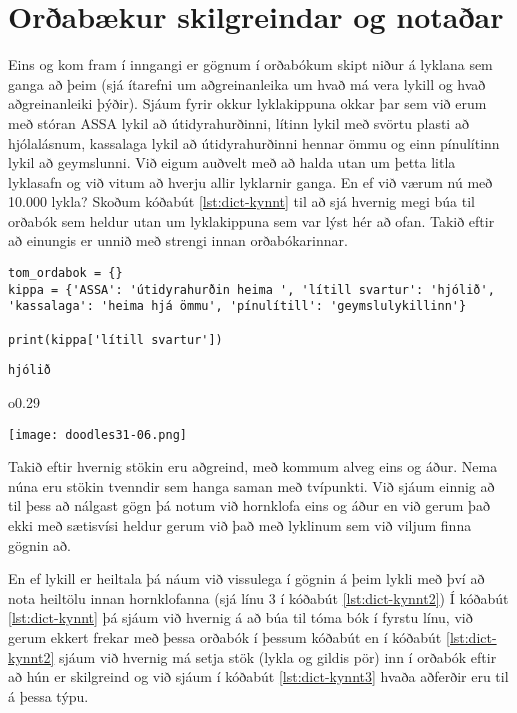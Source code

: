 \section{Orðabækur skilgreindar og notaðar}
Eins og kom fram í inngangi er gögnum í orðabókum skipt niður á lyklana sem ganga að þeim (sjá ítarefni um aðgreinanleika um hvað má vera lykill og hvað aðgreinanleiki þýðir).
Sjáum fyrir okkur lyklakippuna okkar þar sem við erum með stóran ASSA lykil að útidyrahurðinni, lítinn lykil með svörtu plasti að hjólalásnum, kassalaga lykil að útidyrahurðinni hennar ömmu og einn pínulítinn lykil að geymslunni.
Við eigum auðvelt með að halda utan um þetta litla lyklasafn og við vitum að hverju allir lyklarnir ganga.
En ef við værum nú með 10.000 lykla?
Skoðum kóðabút \ref{lst:dict-kynnt} til að sjá hvernig megi búa til orðabók sem heldur utan um lyklakippuna sem var lýst hér að ofan.
Takið eftir að einungis er unnið með strengi innan orðabókarinnar.

\begin{lstlisting}[caption=Orðabók kynnt með lyklakippusamlíkingu, label=lst:dict-kynnt]
tom_ordabok = {}
kippa = {'ASSA': 'útidyrahurðin heima ', 'lítill svartur': 'hjólið', 'kassalaga': 'heima hjá ömmu', 'pínulítill': 'geymslulykillinn'}

print(kippa['lítill svartur'])
\end{lstlisting}
\lstset{style=uttak}
\begin{lstlisting}
hjólið
\end{lstlisting}
\lstset{style=venjulegt}
 \begin{wrapfigure}{o}{0.29\textwidth} %
	\begin{center}
		\texttt{[image: doodles31-06.png]}
	\end{center}
\end{wrapfigure}
\phantom{}

Takið eftir hvernig stökin eru aðgreind, með kommum alveg eins og áður.
Nema núna eru stökin tvenndir sem hanga saman með tvípunkti.
Við sjáum einnig að til þess að nálgast gögn þá notum við hornklofa eins og áður en við gerum það ekki með sætisvísi heldur gerum við það með lyklinum sem við viljum finna gögnin að.

En ef lykill er heiltala þá náum við vissulega í gögnin á þeim lykli með því að nota heiltölu innan hornklofanna (sjá línu 3 í kóðabút \ref{lst:dict-kynnt2})
Í kóðabút \ref{lst:dict-kynnt} þá sjáum við hvernig á að búa til tóma bók í fyrstu línu, við gerum ekkert frekar með þessa orðabók í þessum kóðabút en í kóðabút \ref{lst:dict-kynnt2} sjáum við hvernig má setja stök (lykla og gildis pör) inn í orðabók eftir að hún er skilgreind og við sjáum í kóðabút \ref{lst:dict-kynnt3} hvaða aðferðir eru til á þessa týpu.


